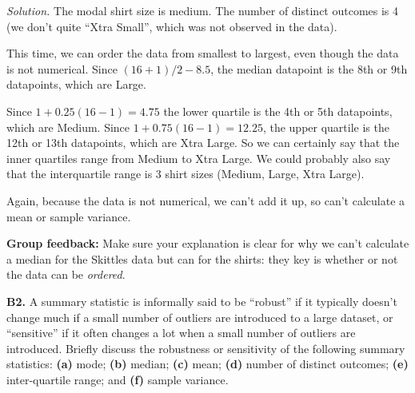 \documentclass[
  a4paper,
]{book}
\theoremstyle{definition}
\theoremstyle{definition}
\theoremstyle{definition}
\theoremstyle{definition}
\theoremstyle{remark}
\begin{document}
\begin{myanswers}
\emph{Solution.}
The modal shirt size is medium. The number of distinct outcomes is 4 (we don't quite ``Xtra Small'', which was not observed in the data).

This time, we can order the data from smallest to largest, even though the data is not numerical. Since \((16 + 1)/2 - 8.5\), the median datapoint is the 8th or 9th datapoints, which are Large.

Since \(1 + 0.25(16 - 1) = 4.75\) the lower quartile is the 4th or 5th datapoints, which are Medium. Since \(1 + 0.75(16-1) = 12.25\), the upper quartile is the 12th or 13th datapoints, which are Xtra Large. So we can certainly say that the inner quartiles range from Medium to Xtra Large. We could probably also say that the interquartile range is 3 shirt sizes (Medium, Large, Xtra Large).

Again, because the data is not numerical, we can't add it up, so can't calculate a mean or sample variance.

\textbf{Group feedback:} Make sure your explanation is clear for why we can't calculate a median for the Skittles data but can for the shirts: they key is whether or not the data can be \emph{ordered}.

\end{myanswers}

\textbf{B2.} A summary statistic is informally said to be ``robust'' if it typically doesn't change much if a small number of outliers are introduced to a large dataset, or ``sensitive'' if it often changes a lot when a small number of outliers are introduced. Briefly discuss the robustness or sensitivity of the following summary statistics: \textbf{(a)} mode; \textbf{(b)} median; \textbf{(c)} mean; \textbf{(d)} number of distinct outcomes; \textbf{(e)} inter-quartile range; and \textbf{(f)} sample variance.
\end{document}
